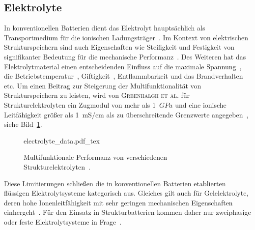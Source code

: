 \subsection{Elektrolyte}
In konventionellen Batterien dient das Elektrolyt hauptsächlich als Transportmedium für die ionischen Ladungsträger~\cite{Gerlach2020}. Im Kontext von elektrischen Strukturspeichern sind auch Eigenschaften wie Steifigkeit und Festigkeit von signifikanter Bedeutung für die mechanische Performanz~\cite{Greenhalgh2023}. Des Weiteren hat das Elektrolytmaterial einen entscheidenden Einfluss auf die maximale Spannung~\cite{Xu2016}, die Betriebstemperatur~\cite{Chen2022a}, Giftigkeit~\cite{Beard2019}, Entflammbarkeit und das Brandverhalten~\cite{Roth2012} etc. Um einen Beitrag zur Steigerung der Multifunktionalität von Strukturspeichern zu leisten, wird von \textsc{Greenhalgh et al.} für Strukturelektrolyten ein Zugmodul von mehr als 1~$\si{GPa}$ und eine ionische Leitfähigkeit größer als 1~$\si{\milli \siemens \per \cm}$ als zu überschreitende Grenzwerte angegeben~\cite{Greenhalgh2023}, siehe Bild~\ref{fig:electrolyte_data}.
\begin{figure}[h]
        \center
		{electrolyte_data.pdf_tex}
		\caption{\label{fig:electrolyte_data}Multifunktionale Performanz von verschiedenen Strukturelektrolyten~\cite{Greenhalgh2023}.}
\end{figure}
Diese Limitierungen schließen die in konventionellen Batterien etablierten flüssigen Elektrolytsysteme kategorisch aus. Gleiches gilt auch für Gelelektrolyte, deren hohe Ionenleitfähigkeit mit sehr geringen mechanischen Eigenschaften einhergeht~\cite{Gayet2009, Li2018, Zhao2020a}. Für den Einsatz in Strukturbatterien kommen daher nur zweiphasige oder feste Elektrolytsysteme in Frage~\cite{Greenhalgh2023}.

